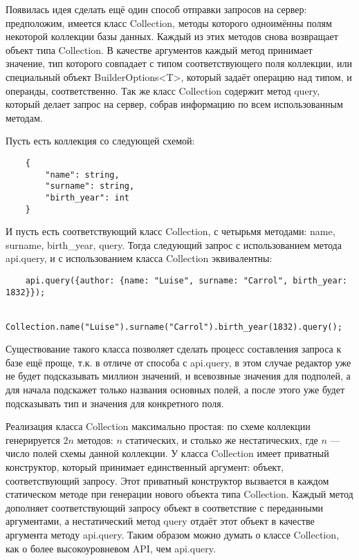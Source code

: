 \documentclass[12pt]{article}
\begin{document}
    Появилась идея сделать ещё один способ отправки запросов на сервер: предположим, имеется класс Collection, методы которого одноимённы полям некоторой
    коллекции базы данных. Каждый из этих методов снова возвращает объект типа Collection. В качестве аргументов каждый метод принимает значение,
    тип которого совпадает с типом соответствующего поля коллекции, или специальный объект BuilderOptions<T>, который задаёт операцию над типом, и
    операнды, соответственно. Так же класс Collection содержит метод query, который делает запрос на сервер, собрав информацию по всем использованным методам.
    \begin{example}
        Пусть есть коллекция со следующей схемой:
        \begin{lstlisting}
    {
        "name": string,
        "surname": string,
        "birth_year": int
    }
        \end{lstlisting}
        И пусть есть соответствующий класс Collection, с четырьмя методами: name, surname, birth\_year, query. Тогда следующий запрос с использованием
        метода api.query, и с использованием класса Collection эквивалентны:
        \begin{lstlisting}
    api.query({author: {name: "Luise", surname: "Carrol", birth_year: 1832}});

    Collection.name("Luise").surname("Carrol").birth_year(1832).query();
        \end{lstlisting}

    \end{example}

    Существование такого класса позволяет сделать процесс составления запроса к базе ещё проще, т.к. в отличе от способа
    с api.query, в этом случае редактор уже не будет подсказывать миллион значений, и всевозвные значения для подполей, а для начала подскажет
    только названия основных полей, а после этого уже будет подсказывать тип и значения для конкретного поля.

    Реализация класса Collection максимально простая: по схеме коллекции генерируется $2n$ методов: $n$ статических, и столько же нестатических,
    где $n$ --- число полей схемы данной коллекции. У класса Collection имеет приватный конструктор, который принимает единственный аргумент:
    объект, соответствующий запросу. Этот приватный конструктор вызвается в каждом статическом методе при генерации нового объекта типа Collection.
    Каждый метод дополняет соответствующий запросу объект в соответствие с переданными аргументами, а нестатический метод query отдаёт этот объект
    в качестве аргумента методу api.query. Таким образом можно думать о классе Collection, как о более высокоуровневом API, чем api.query.
    \newpage
\end{document}
